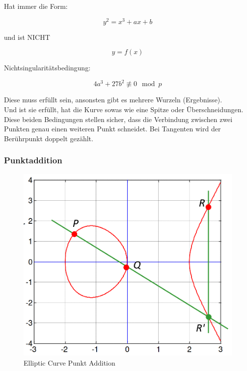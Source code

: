 \documentclass[12pt]{scrartcl}
\begin{document}
Hat immer die Form:

\[ y^2 = x^3 + ax + b \]

und ist NICHT

\[ y = f(x) \]


Nichtsingularitätsbedingung:

\[ 4a^3 + 27b^2 \not\equiv 0 \mod p \]

Diese muss erfüllt sein, ansonsten gibt es mehrere Wurzeln (Ergebnisse).\\
Und ist sie erfüllt, hat die Kurve sowas wie eine Spitze oder Überschneidungen.\\


Diese beiden Bedingungen stellen sicher, dass die Verbindung zwischen zwei Punkten genau
einen weiteren Punkt schneidet. Bei Tangenten wird der Berührpunkt doppelt gezählt.





\newpage
\subsubsection{Punktaddition}

\begin{figure}[ht]
    \centering
    \includegraphics[width=\textwidth]{img/elliptic_curve_addition.png}
    \caption{Elliptic Curve Punkt Addition}
    \label{fig:elliptic_curve_addition}
\end{figure}
\end{document}
